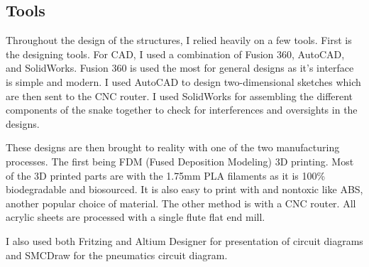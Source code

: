 \documentclass[twoside]{article}
\begin{document}
\subsection{Tools}
Throughout the design of the structures, I relied heavily on a few tools. First is the designing tools. For CAD, I used a combination of Fusion 360, AutoCAD, and SolidWorks. Fusion 360 is used the most for general designs as it’s interface is simple and modern. I used AutoCAD to design two-dimensional sketches which are then sent to the CNC router. I used SolidWorks for assembling the different components of the snake together to check for interferences and oversights in the designs. 

These designs are then brought to reality with one of the two manufacturing processes. The first being FDM (Fused Deposition Modeling) 3D printing. Most of the 3D printed parts are with the 1.75mm PLA filaments as it is 100\% biodegradable and biosourced. It is also easy to print with and nontoxic like ABS, another popular choice of material. The other method is with a CNC router. All acrylic sheets are processed with a single flute flat end mill.

I also used both Fritzing and Altium Designer for presentation of circuit diagrams and SMCDraw for the pneumatics circuit diagram.
\end{document}
